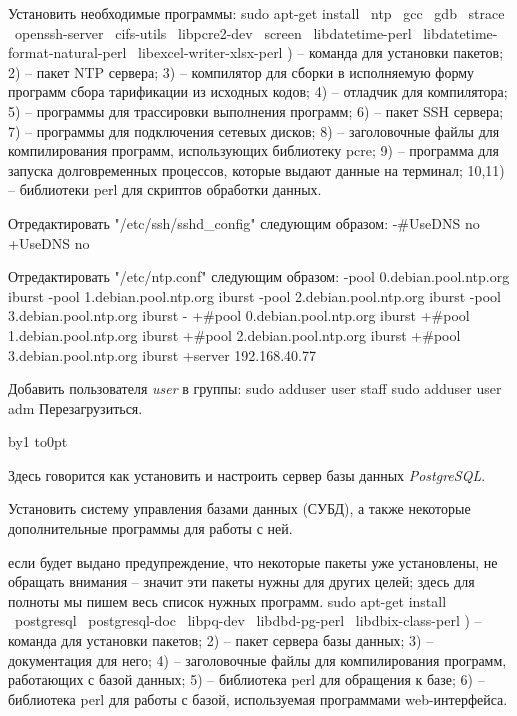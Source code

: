 \noindent Установить необходимые программы:
\begintt
sudo apt-get install \
  ntp \
  gcc \
  gdb \
  strace \
  openssh-server \
  cifs-utils \
  libpcre2-dev \
  screen \
  libdatetime-perl \
  libdatetime-format-natural-perl \
  libexcel-writer-xlsx-perl
\endtt
\baselineskip=9pt\eightrm
\noindent
1) -- команда для установки пакетов;
2) -- пакет NTP сервера;
3) -- компилятор для сборки в исполняемую форму программ сбора тарификации из исходных кодов;
4) -- отладчик для компилятора;
5) -- программы для трассировки выполнения программ;
6) -- пакет SSH сервера;
7) -- программы для подключения сетевых дисков;
8) -- заголовочные файлы для компилирования программ, использующих библиотеку {\eightsl pcre\/};
9) -- программа для запуска долговременных процессов, которые выдают данные на терминал;
10,11) -- библиотеки {\eightsl perl\/} для скриптов обработки данных.
\par\vskip1mm\normalbaselines\rm
\medskip

\noindent Отредактировать "/etc/ssh/sshd_config" следующим образом:
\begtt
-#UseDNS no
+UseDNS no
\endtt
\medskip

\noindent Отредактировать "/etc/ntp.conf" следующим образом:
\begtt
-pool 0.debian.pool.ntp.org iburst
-pool 1.debian.pool.ntp.org iburst
-pool 2.debian.pool.ntp.org iburst
-pool 3.debian.pool.ntp.org iburst
-
+#pool 0.debian.pool.ntp.org iburst
+#pool 1.debian.pool.ntp.org iburst
+#pool 2.debian.pool.ntp.org iburst
+#pool 3.debian.pool.ntp.org iburst
+server 192.168.40.77
\endtt
\medskip

\noindent Добавить пользователя {\sl user\/} в группы:
\begtt
sudo adduser user staff
sudo adduser user adm
\endtt
\medskip
\noindent Перезагрузиться.
\medskip

\removelastskip\bigskip
\advance\subsecnum by1
\noindent\vbox to0pt{\vss
  \kern-5pt}%
\par
\nobreak\smallskip
\medskip

Здесь говорится как установить и настроить сервер базы данных {\sl PostgreSQL}.
\smallskip

\N
Установить систему управления базами данных (СУБД), а также некоторые дополнительные программы для работы с ней. \par
{} если будет выдано предупреждение, что некоторые пакеты уже установлены, не обращать внимания -- значит эти пакеты нужны для других целей; здесь для полноты мы пишем весь список нужных программ.
\begintt
sudo apt-get install \
  postgresql \
  postgresql-doc \
  libpq-dev \
  libdbd-pg-perl \
  libdbix-class-perl
\endtt
\baselineskip=9pt\eightrm
\noindent
1) -- команда для установки пакетов;
2) -- пакет сервера базы данных;
3) -- документация для него;
4) -- заголовочные файлы для компилирования программ, работающих с базой данных;
5) -- библиотека {\eightsl perl\/} для обращения к базе;
6) -- библиотека {\eightsl perl\/} для работы с базой, используемая программами web-интерфейса.
\par\vskip1mm\normalbaselines\rm
\medskip


